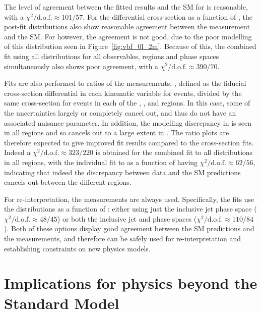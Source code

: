 \documentclass[atlasdraft=false, cernpreprint, UKenglish, texmf, orcidlogo]{atlasdoc}
\begin{document}
The level of agreement between the fitted results and the SM for \ptrec is reasonable, with a $\chi^2/\text{d.o.f.} \approx 101/57$.
For the differential cross-section as a function of \dphijj, the post-fit distributions also show reasonable agreement
between the measurement and the SM\@.
For \mjj however, the agreement is not good, due to the poor modelling of this distribution seen in Figure~\ref{fig:vbf_0l_2m}.
Because of this, the combined fit using all distributions for all observables, regions and phase spaces simultaneously also shows poor agreement,
with a $\chi^2/\text{d.o.f.}  \approx 390/70$.
 
Fits are also performed to ratios of the measurements, \rmiss, defined as the fiducial cross-section differential in each kinematic variable
for \ptmissjets events, divided by the same cross-section for events in each of the \oneeljets, \onemujets, \twoeljets and \twomujets regions. In this case,
some of the uncertainties largely or completely cancel out, and thus do not have an associated nuisance parameter. In addition, the modelling discrepancy in
\mjj is seen in all regions and so cancels out to a large extent in \rmiss. The ratio plots are therefore expected to give improved fit results
compared to the cross-section fits. Indeed a $\chi^2/\text{d.o.f.} \approx 323/220$ is obtained for the combined \rmiss fit to all distributions in all regions,
with the individual fit to \rmiss as a function of \mjj having $\chi^2/\text{d.o.f.} \approx 62/56$, indicating that indeed the discrepancy between
data and the SM predictions cancels out between the different regions.
 
For re-interpretation, the \rmiss measurements are always used. Specifically, the fits use the \rmiss distributions as a function of \ptmiss: either using just the inclusive jet phase space ($\chi^2/\text{d.o.f.} \approx 48/45$) or both the inclusive jet and \vbf phase spaces ($\chi^2/\text{d.o.f.} \approx 110/84$). Both of these options display good agreement between the SM predictions and the measurements, and therefore can be safely used for re-interpretation and establishing constraints on new physics models.
 
\FloatBarrier
 


 

 
\section{Implications for physics beyond the Standard Model}
\label{sec:interpretation}
 
\end{document}

